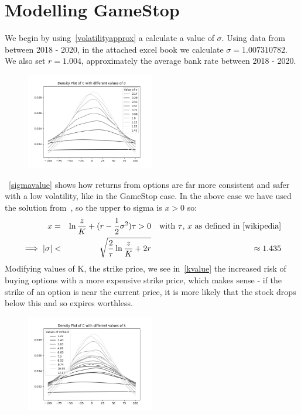 \documentclass[11pt]{article} %
\begin{document}
\section{Modelling GameStop}
We begin by using~\eqref{volatilityapprox} a calculate a value of $\sigma$. Using data from 
~\cite{nyse} between 2018 - 2020, in the attached excel book we 
calculate $\sigma = 1.007310782$. We also set 
$r=1.004$, approximately the average bank rate between 2018 - 2020.
\begin{figure}[h] 
    \centering
    \includegraphics[width=0.5\textwidth]{sigmavalue.png} 
    \caption[]{}\label{sigmavalue}
\end{figure}
~\eqref{sigmavalue} shows how returns from options are far more consistent and safer with a low volatility,
 like in the GameStop case. In the above case we have used the solution from~\cite{wikipedia}, 
 so the upper to sigma is $x>0$ so:
\begin{align}
    x =&& \ln{\frac{z}{K}} + (r - \frac{1}{2} \sigma^2)\tau > 0 && 
    \text{with $\tau$, $x$ as defined in~\cite{wikipedia}} \\
    \implies |\sigma| <&& \sqrt{\frac{2}{\tau} \ln{\frac{z}{K} + 2r}} && \approx 1.435
\end{align}
Modifying values of K, the strike price, we see in~\eqref{kvalue} the increased risk 
of buying options with a more expensive strike price, which makes sense - if 
the strike of an option is near the current price, it is more likely that 
the stock drops below this and so expires worthless.
\begin{figure}[h] 
    \centering
    \includegraphics[width=0.5\textwidth]{kvalue.png} 
    \caption[]{}\label{kvalue}
\end{figure}
\end{document}

